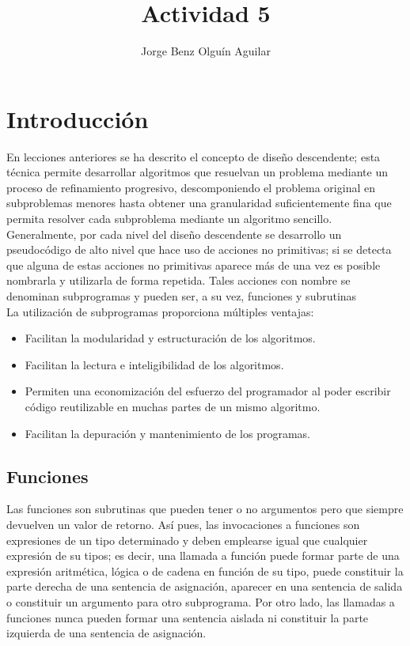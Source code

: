 \documentclass[12pt,a4paper,openright]{article}
\author{Jorge Benz Olguín Aguilar}
\title{Actividad 5}
\begin{document}
\maketitle

\section*{Introducción}

En lecciones anteriores se ha descrito el concepto de diseño descendente; esta técnica permite desarrollar
algoritmos que resuelvan un problema mediante un proceso de refinamiento progresivo, descomponiendo el problema
original en subproblemas menores hasta obtener una granularidad suficientemente fina que permita resolver cada
subproblema mediante un algoritmo sencillo.
Generalmente, por cada nivel del diseño descendente se desarrollo un pseudocódigo de alto nivel que hace
uso de acciones no primitivas; si se detecta que alguna de estas acciones no primitivas aparece más de una vez es
posible nombrarla y utilizarla de forma repetida. Tales acciones con nombre se denominan subprogramas y pueden ser,
a su vez, funciones y subrutinas \\

La utilización de subprogramas proporciona múltiples ventajas:
\begin{itemize}
\item Facilitan la modularidad y estructuración de los algoritmos.
\item Facilitan la lectura e inteligibilidad de los algoritmos.
\item Permiten una economización del esfuerzo del programador al poder escribir código reutilizable en muchas
partes de un mismo algoritmo.
\item Facilitan la depuración y mantenimiento de los programas.
\end{itemize}


\subsection*{Funciones}

Las funciones son subrutinas que pueden tener o no argumentos pero que siempre devuelven un valor de
retorno. Así pues, las invocaciones a funciones son expresiones de un tipo determinado y deben emplearse igual que
cualquier expresión de su tipos; es decir, una llamada a función puede formar parte de una expresión aritmética, lógica o
de cadena en función de su tipo, puede constituir la parte derecha de una sentencia de asignación, aparecer en una
sentencia de salida o constituir un argumento para otro subprograma. Por otro lado, las llamadas a funciones nunca
pueden formar una sentencia aislada ni constituir la parte izquierda de una sentencia de asignación.
\end{document}
